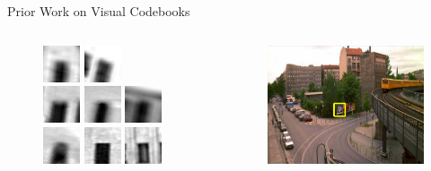 \documentclass[mathserif]{beamer}
\begin{document}
\begin{frame}{Prior Work on Visual Codebooks}
\begin{columns}
\begin{column}{.5\textwidth}
\begin{figure}
                \includegraphics[width=.5cm]{illustrations/related_work/video_google/video_google_dict2_23}
                \includegraphics[width=.5cm]{illustrations/related_work/video_google/video_google_dict2_24}\\
                \includegraphics[width=.5cm]{illustrations/related_work/video_google/video_google_dict2_25}
                \includegraphics[width=.5cm]{illustrations/related_work/video_google/video_google_dict2_26}
                \includegraphics[width=.5cm]{illustrations/related_work/video_google/video_google_dict2_27}
                \includegraphics[width=.5cm]{illustrations/related_work/video_google/video_google_dict2_28}
                \includegraphics[width=.5cm]{illustrations/related_work/video_google/video_google_dict2_29}
                \includegraphics[width=.5cm]{illustrations/related_work/video_google/video_google_dict2_30}
            \end{figure}
        \end{column}
        \begin{column}{.5\textwidth}
            \begin{figure}
                \includegraphics[width=.4\textwidth]{illustrations/related_work/video_google/query_1_large}

\end{figure}
\end{column}
\end{columns}
\end{frame}
\end{document}
